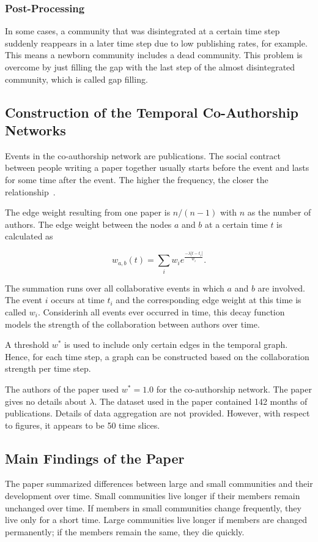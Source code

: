 \documentclass[runningheads,a4paper]{llncs}
\begin{document}
\subsubsection{Post-Processing}
In some cases, a community that was disintegrated at a certain time step suddenly reappears in a later time step due to low publishing rates, for example.
This means a newborn community includes a dead community.
This problem is overcome by just filling the gap with the last step of the almost disintegrated community, which is called gap filling.

\subsection{Construction of the Temporal Co-Authorship Networks}
\label{evolution-constr}
Events in the co-authorship network are publications.
The social contract between people writing a paper together usually starts before the event and lasts for some time after the event. The higher the frequency, the closer the relationship~\cite{ramasco2006social}.

The edge weight resulting from one paper is $n/(n-1)$ with $n$ as the number of authors.
The edge weight between the nodes $a$ and $b$ at a certain time $t$ is calculated as

$$w_{a,b}(t)= \sum_{i}^{} w_i e^{\frac{-\lambda \left|t-t_i\right|}{w_i}}.$$

The summation runs over all collaborative events in which $a$ and $b$ are involved.
The event $i$ occurs at time $t_i$ and the corresponding edge weight at this time is called $w_i$.
Considerinh all events ever occurred in time, this decay function models the strength of the collaboration between authors over time.

A threshold $w^*$ is used to include only certain edges in the temporal graph. Hence, for each time step, a graph can be constructed based on the collaboration strength per time step.

The authors of the paper used $w^*=1.0$ for the co-authorship network.
The paper gives no details about $\lambda$.
The dataset used in the paper contained 142 months of publications. Details of data aggregation are not provided. However, with respect to figures, it appears to be 50 time slices.

\subsection{Main Findings of the Paper}
\label{evolution-findings}
The paper summarized differences between large and small communities and their development over time. Small communities live longer if their members remain unchanged over time. If members in small communities change frequently, they live only for a short time. Large communities live longer if members are changed permanently; if the members remain the same, they die quickly.
\end{document}
